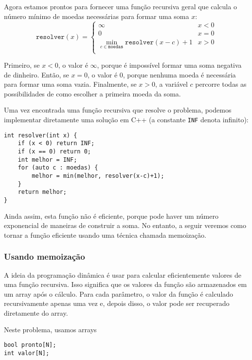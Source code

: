 Agora estamos prontos para fornecer uma função recursiva geral
que calcula o número mínimo de
moedas necessárias para formar uma soma $x$:
\begin{equation*}
    \texttt{resolver}(x) = \begin{cases}
               \infty               & x < 0\\
               0               & x = 0\\
               \min_{c \in \texttt{moedas}} \texttt{resolver}(x-c)+1 & x > 0 \\
           \end{cases}
\end{equation*}

Primeiro, se $x<0$, o valor é $\infty$,
porque é impossível formar uma soma negativa
de dinheiro.
Então, se $x=0$, o valor é $0$,
porque nenhuma moeda é necessária para formar uma soma vazia.
Finalmente, se $x>0$, a variável $c$ percorre
todas as possibilidades de como escolher a primeira moeda
da soma.

Uma vez encontrada uma função recursiva que resolve o problema,
podemos implementar diretamente uma solução em C++
(a constante \texttt{INF} denota infinito):

\begin{lstlisting}
int resolver(int x) {
    if (x < 0) return INF;
    if (x == 0) return 0;
    int melhor = INF;
    for (auto c : moedas) {
        melhor = min(melhor, resolver(x-c)+1);
    }
    return melhor;
}
\end{lstlisting}

Ainda assim, esta função não é eficiente,
porque pode haver um número exponencial de maneiras
de construir a soma.
No entanto, a seguir veremos como tornar a
função eficiente usando uma técnica chamada memoização.

\subsubsection{Usando memoização}


A ideia da programação dinâmica é usar
 para calcular eficientemente
valores de uma função recursiva.
Isso significa que os valores da função
são armazenados em um array após o cálculo.
Para cada parâmetro, o valor da função
é calculado recursivamente apenas uma vez e, depois disso,
o valor pode ser recuperado diretamente do array.

Neste problema, usamos arrays
\begin{lstlisting}
bool pronto[N];
int valor[N];
\end{lstlisting}

